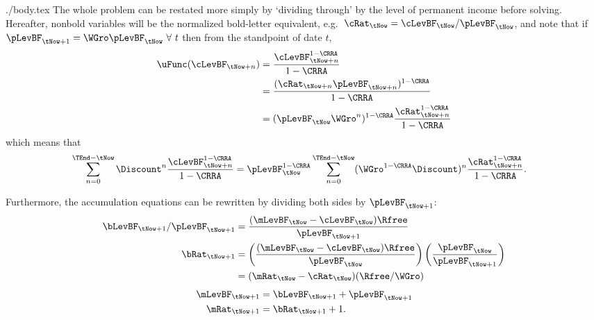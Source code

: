 \documentclass{handout}
\begin{document}
\begin{verbatimwrite}{./body.tex}
The whole problem can be restated more simply by `dividing through' by the level of
permanent income before solving.  Hereafter, nonbold variables will be
the normalized bold-letter equivalent, e.g.\
$\cRat_{\tNow}=\cLevBF_{\tNow}/\pLevBF_{\tNow}$, and note that if
$\pLevBF_{\tNow+1}={\WGro} \pLevBF_{\tNow}~\forall~t$ then from the standpoint
of date $t$,
\begin{equation}\begin{gathered}\begin{aligned}
        \uFunc(\cLevBF_{\tNow+n}) & =  \frac{\cLevBF_{\tNow+n}^{1-\CRRA}}{1-\CRRA}  \\
         & =  \frac{(\cRat_{\tNow+n}\pLevBF_{\tNow+n})^{1-\CRRA}}{1-\CRRA}  \\
         & =  (\pLevBF_{\tNow}{\WGro}^{n})^{1-\CRRA}\frac{\cRat_{\tNow+n}^{1-\CRRA}}{1-\CRRA}
\end{aligned}\end{gathered}\end{equation}
which means that 
\begin{equation}\begin{gathered}\begin{aligned}
        \sum_{n=0}^{\TEnd-\tNow} \Discount^{n}\frac{\cLevBF_{\tNow+n}^{1-\CRRA}}{1-\CRRA} & =  \pLevBF_{\tNow}^{1-\CRRA}\sum_{n=0}^{\TEnd-\tNow} ({\WGro}^{1-\CRRA}\Discount)^{n} \frac{\cRat_{\tNow+n}^{1-\CRRA}}{1-\CRRA}  \label{eq:maxc2}
.
\end{aligned}\end{gathered}\end{equation}

Furthermore, the accumulation equations can be rewritten by dividing
both sides by $\pLevBF_{\tNow+1}$:
\begin{equation}\begin{gathered}\begin{aligned}
        \bLevBF_{\tNow+1}/\pLevBF_{\tNow+1} & =  \frac{(\mLevBF_{\tNow}-\cLevBF_{\tNow})\Rfree}{\pLevBF_{\tNow+1}}  \\
        \bRat_{\tNow+1} & =   \left(\frac{(\mLevBF_{\tNow}-\cLevBF_{\tNow})\Rfree}{\pLevBF_{\tNow}}\right)\left(\frac{\pLevBF_{\tNow}}{\pLevBF_{\tNow+1}}\right) \\
         & =  (\mRat_{\tNow}-\cRat_{\tNow})(\Rfree/{\WGro})
\end{aligned}\end{gathered}\end{equation}
\begin{equation}\begin{gathered}\begin{aligned}
        \mLevBF_{\tNow+1} & =  \bLevBF_{\tNow+1}+\pLevBF_{\tNow+1}
\\      \mRat_{\tNow+1} & =  \bRat_{\tNow+1}+1.
\end{aligned}\end{gathered}\end{equation}


\end{verbatimwrite}
\end{document}
